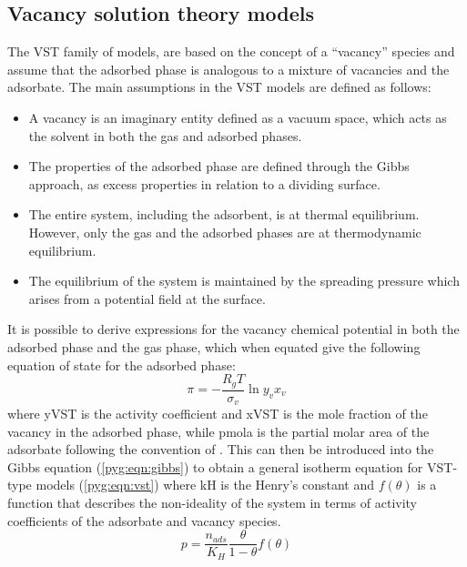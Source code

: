 \subsection{Vacancy solution theory models}\label{pyg:models:vst}

The \gls{VST} family of models,
are based on the concept of a “vacancy” species and
assume that the adsorbed phase is analogous to a mixture of
vacancies and the adsorbate. The main assumptions in the
\gls{VST} models are defined as follows:

\begin{itemize}

	\item A vacancy is an imaginary entity defined as a vacuum
	      space, which acts as the solvent in both the gas and adsorbed
	      phases.
	\item The properties of the adsorbed phase are defined through
	      the Gibbs approach, as excess properties in relation to
	      a dividing surface.
	\item The entire system, including the adsorbent, is at
	      thermal equilibrium. However, only the gas and the adsorbed
	      phases are at thermodynamic equilibrium.
	\item The equilibrium of the system is maintained by the
	      spreading pressure which arises from a potential field
	      at the surface.

\end{itemize}

It is possible to derive expressions for the vacancy chemical
potential in both the adsorbed phase and the gas phase, which when
equated give the following equation of state for the adsorbed phase:
%
\begin{equation}
	\pi = - \frac{R_g T}{\sigma_v} \ln{y_v x_v}
\end{equation}
%
where \gls{yVST} is the activity coefficient and \gls{xVST} is the mole
fraction of the vacancy in the adsorbed phase, while \gls{pmola}
is the partial molar area of the adsorbate following the 
convention of \citet{lucassen-reyndersSurfaceEquationState1972}. 
This can then be introduced into the Gibbs equation 
(\autoref{pyg:eqn:gibbs})
to obtain a general isotherm equation for \gls{VST}-type models
(\autoref{pyg:eqn:vst}) where \gls{kH} is the Henry’s constant and
\(f(\theta)\) is a function that describes the non-ideality of the
system in terms of activity coefficients of the adsorbate and
vacancy species.
%
\begin{equation}\label{pyg:eqn:vst}
	p = \frac{n_{ads}}{K_H} \frac{\theta}{1-\theta} f(\theta)
\end{equation}

